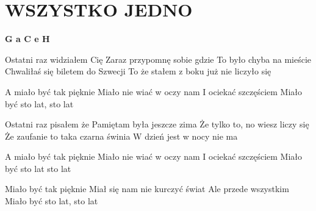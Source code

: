 \documentclass[../../../songbook.tex]{subfiles}
\begin{document}
\TabPositions{8cm} %
\section*{WSZYSTKO JEDNO}
{}
\vspace{0.5cm}
{\color{red}\textbf{G a C e H} } \newline	  

Ostatni raz widziałem Cię			 \newline	  
Zaraz przypomnę sobie gdzie			 \newline	  
To było chyba na mieście			 \newline	  
Chwaliłaś się biletem do Szwecji		  \newline	  
To że stałem z boku już nie liczyło się	  \newline	  

\-\hspace{1cm} A miało być tak pięknie		 \newline
\-\hspace{1cm} Miało nie wiać w oczy nam	 \newline
\-\hspace{1cm} I ociekać szczęściem		 \newline
\-\hspace{1cm} Miało być sto lat, sto lat	 \newline

Ostatni raz pisałem że  \newline
Pamiętam była jeszcze zima \newline
Że tylko to, no wiesz liczy się  \newline
Że zaufanie to taka czarna świnia  \newline
W dzień jest w nocy nie ma  \newline

\-\hspace{1cm} A miało być tak pięknie  \newline
\-\hspace{1cm} Miało nie wiać w oczy nam  \newline
\-\hspace{1cm} I ociekać szczęściem  \newline
\-\hspace{1cm} Miało być sto lat sto lat  \newline

\-\hspace{1cm} Miało być tak pięknie  \newline
\-\hspace{1cm} Miał się nam nie kurczyć świat  \newline
\-\hspace{1cm} Ale przede wszystkim  \newline
\-\hspace{1cm} Miało być sto lat, sto lat \newline
\end{document}
